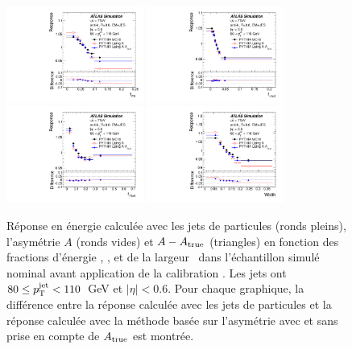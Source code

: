 \begin{figure}[!ht]
\centering
\includegraphics[width=0.4\textwidth]{figures/fig_47a.pdf}
\hspace{1.cm}
\includegraphics[width=0.4\textwidth]{figures/fig_47b.pdf}\\
\includegraphics[width=0.4\textwidth]{figures/fig_47c.pdf}
\hspace{1.cm}
\includegraphics[width=0.4\textwidth]{figures/fig_47d.pdf}
\caption{R\'eponse en \'energie calcul\'ee avec les jets de particules (ronds pleins), l'asym\'etrie $A$ (ronds vides) et $A - A_{\rm true}$ (triangles) en fonction des fractions d'\'energie \fpres{}, \fem{}, \ftile{} et de la largeur \width~dans l'\'echantillon simul\'e nominal avant application de la calibration \GS. Les jets ont $80 \le p_{\mathrm{T}}^\mathrm{jet} < 110$~GeV et $|\eta| < 0.6$. Pour chaque graphique, la diff\'erence entre la r\'eponse calcul\'ee avec les jets de particules et la r\'eponse calcul\'ee avec la m\'ethode bas\'ee sur l'asym\'etrie avec et sans prise en compte de $A_{\rm true}$ est montr\'ee.}
\label{fig:DijetMethodMC}
\end{figure}

